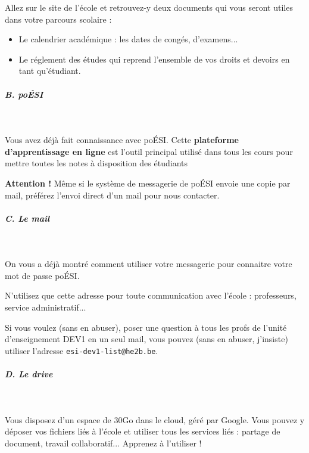 \documentclass[a4paper,11pt]{article}
\begin{document}
 \par
        
\begin{Exercice}{}
Allez sur le site de l'\'ecole et retrouvez-y deux documents qui vous seront utiles dans votre parcours scolaire :
\begin{itemize}
\item Le calendrier acad\'emique : les dates de cong\'es, d'examens...
\item Le r\'eglement des \'etudes qui reprend l'ensemble de vos droits et devoirs en tant qu'\'etudiant.
\end{itemize}
\end{Exercice}				

        
\subparagraph{B. po\'ESI} 
\textcolor{white}{.} \par
Vous avez d\'ej\`a fait connaissance avec po\'ESI. Cette \textbf{plateforme d'apprentissage en ligne} est l'outil principal utilis\'e dans tous les cours pour mettre toutes les notes \`a disposition des \'etudiants
			
 \par
 \textbf{Attention !} M\^eme si le syst\`eme de messagerie de po\'ESI envoie une copie par mail, pr\'ef\'erez l'envoi direct d'un mail pour nous contacter. 
			
 \par
        
			
\subparagraph{C. Le mail} 
		
\textcolor{white}{.} \par On vous a d\'ej\`a montr\'e comment utiliser votre messagerie pour connaitre votre mot de passe 
po\'ESI. 
			
 \par N'utilisez que cette adresse pour toute communication avec l'\'ecole : professeurs, service administratif...
 \par
Si vous voulez (sans en abuser), poser une question \`a tous les profs de l'unit\'e d'enseignement DEV1 en un seul mail, vous pouvez (sans en abuser, j'insiste) utiliser l'adresse \texttt{esi-dev1-list@he2b.be}.
			
 \par
        
\subparagraph{D. Le drive} 
		
\textcolor{white}{.} \par
				
Vous disposez d'un espace de 30Go dans le cloud, g\'er\'e par Google. Vous pouvez y d\'eposer vos fichiers li\'es \`a l'\'ecole et utiliser tous les services li\'es : partage de document, travail collaboratif... Apprenez \`a l'utiliser !
			
\end{document}
